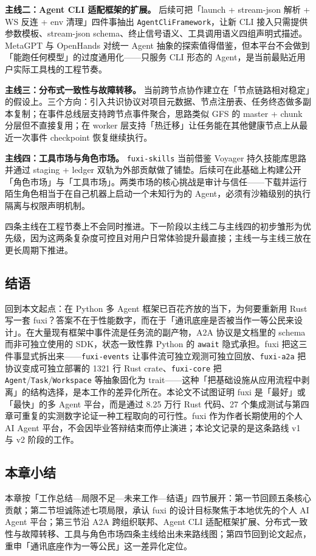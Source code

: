 \textbf{主线二：Agent CLI 适配框架的扩展。} 后续可把「launch + stream-json 解析 + WS 反连 + env 清理」四件事抽出 \texttt{AgentCliFramework}，让新 CLI 接入只需提供参数模板、stream-json schema、终止信号语义、工具调用语义四组声明式描述。MetaGPT 与 OpenHands\parencite{wang2024openhands} 对统一 Agent 抽象的探索值得借鉴，但本平台不会做到「能跑任何模型」的过度通用化——只服务 CLI 形态的 Agent，是当前最贴近用户实际工具栈的工程节奏。

\textbf{主线三：分布式一致性与故障转移。} 当前跨节点协作建立在「节点链路相对稳定」的假设上。三个方向：引入共识协议对项目元数据、节点注册表、任务终态做多副本复制；在事件总线层支持跨节点事件聚合，思路类似 GFS\parencite{ghemawat2003gfs} 的 master + chunk 分层但不直接复用；在 worker 层支持「热迁移」让任务能在其他健康节点上从最近一次事件 checkpoint 恢复继续执行。

\textbf{主线四：工具市场与角色市场。} \texttt{fuxi-skills} 当前借鉴 Voyager\parencite{wang2023voyager} 持久技能库思路并通过 staging + ledger 双轨为外部贡献做了铺垫。后续可在此基础上构建公开「角色市场」与「工具市场」。两类市场的核心挑战是审计与信任——下载并运行陌生角色相当于在自己机器上启动一个未知行为的 Agent，必须有沙箱级别的执行隔离与权限声明机制。

四条主线在工程节奏上不会同时推进。下一阶段以主线二与主线四的初步雏形为优先级，因为这两条复杂度可控且对用户日常体验提升最直接；主线一与主线三放在更长周期下推进。

\subsection{结语}
\label{subsec:closing}

回到本文起点：在 Python 多 Agent 框架已百花齐放的当下，为何要重新用 Rust 写一套 fuxi？答案不在于性能数字，而在于「通讯底座是否被当作一等公民来设计」。在大量现有框架中事件流是任务流的副产物，A2A 协议是文档里的 schema 而非可独立使用的 SDK，状态一致性靠 Python 的 \texttt{await} 隐式承担。fuxi 把这三件事显式拆出来——\texttt{fuxi-events} 让事件流可独立观测可独立回放、\texttt{fuxi-a2a} 把协议变成可独立部署的 1321 行 Rust crate、\texttt{fuxi-core} 把 \texttt{Agent}/\texttt{Task}/\texttt{Workspace} 等抽象固化为 trait——这种「把基础设施从应用流程中剥离」的结构选择，是本工作的差异化所在。本论文不试图证明 fuxi 是「最好」或「最快」的多 Agent 平台，而是通过 8.25 万行 Rust 代码、27 个集成测试与第四章可重复的实测数字论证一种工程取向的可行性。fuxi 作为作者长期使用的个人 AI Agent 平台，不会因毕业答辩结束而停止演进；本论文记录的是这条路线 v1 与 v2 阶段的工作。

\subsection{本章小结}

本章按「工作总结—局限不足—未来工作—结语」四节展开：第一节回顾五条核心贡献；第二节坦诚陈述七项局限，承认 fuxi 的设计目标聚焦于本地优先的个人 AI Agent 平台；第三节沿 A2A 跨组织联邦、Agent CLI 适配框架扩展、分布式一致性与故障转移、工具与角色市场四条主线给出未来路线图；第四节回到论文起点，重申「通讯底座作为一等公民」这一差异化定位。
